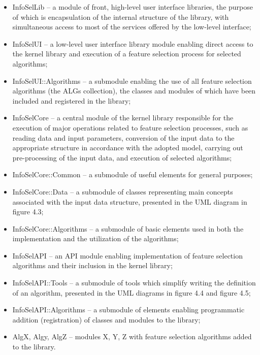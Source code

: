 \documentclass[a4paper,fleqn]{report}
\begin{document}
\begin{itemize}
\item InfoSelLib -- a module of front, high-level user interface libraries, the purpose of which is encapsulation 
                   of the internal structure of the library, 
                   with simultaneous access to most of the services offered by the low-level interface;
\item InfoSelUI -- a low-level user interface library module enabling direct access to the kernel library and execution of a feature selection process for selected algorithms;
\item InfoSelUI::Algorithms -- a submodule enabling the use of all feature selection algorithms (the ALGs collection), 
                 the classes and modules of which have been included and registered in the library;
\item InfoSelCore -- a central module of the kernel library responsible for the execution of major operations related to feature selection processes, 
                    such as reading data and input parameters, conversion of the input 
                    data to the appropriate structure in accordance with the adopted model, 
                   carrying out pre-processing of the input data, and execution of selected algorithms;
\item InfoSelCore::Common -- a submodule of useful elements for general purposes;
\item InfoSelCore::Data -- a submodule of classes representing main concepts associated with the input data structure, 
                 presented in the UML diagram in figure 4.3; %
\item InfoSelCore::Algorithms -- a submodule of basic elements used in both the implementation and the utilization of the algorithms;
\item InfoSelAPI -- an API module enabling implementation of feature selection algorithms and their inclusion in the kernel library;
\item InfoSelAPI::Tools -- a submodule of tools which simplify writing the definition of an algorithm, presented in the UML diagrams in figure 4.4 and figure 4.5; %
\item InfoSelAPI::Algorithms -- a submodule of elements enabling programmatic addition (registration) of classes and modules to the library;
\item AlgX, Algy, AlgZ -- modules X, Y, Z with feature selection algorithms added to the library.
\end{itemize}
\end{document}
